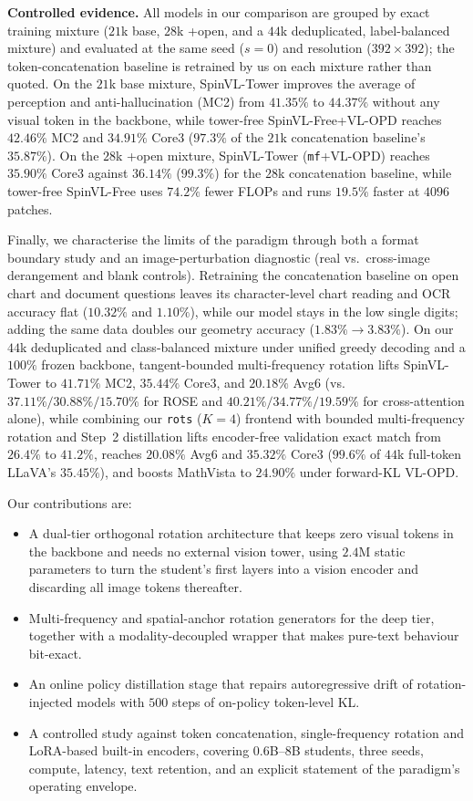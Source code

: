 \documentclass[10pt,twocolumn,letterpaper]{article}
\newcommand{\modelname}{SpinVL}
\begin{document}
\textbf{Controlled evidence.} All models in our comparison are grouped by exact
training mixture ($21$k base, $28$k +open, and a $44$k deduplicated,
label-balanced mixture) and evaluated at the same seed ($s{=}0$) and resolution
($392{\times}392$); the token-concatenation baseline is retrained by us on each
mixture rather than quoted. On the $21$k base mixture, \modelname-Tower{}
improves the average of perception and anti-hallucination (MC2) from $41.35\%$
to $44.37\%$ without any visual token in the backbone, while tower-free
\modelname-Free{}+VL-OPD reaches $42.46\%$ MC2 and $34.91\%$ Core3 ($97.3\%$ of
the $21$k concatenation baseline's $35.87\%$). On the $28$k +open mixture,
\modelname-Tower{} (\texttt{mf}+VL-OPD) reaches $35.90\%$ Core3 against $36.14\%$
($99.3\%$) for the $28$k concatenation baseline, while tower-free
\modelname-Free{} uses $74.2\%$ fewer FLOPs and runs $19.5\%$ faster at
$4096$ patches.

Finally, we characterise the limits of the paradigm through both a format
boundary study and an image-perturbation diagnostic (real vs.\ cross-image
derangement and blank controls). Retraining the concatenation baseline on open
chart and document questions leaves its character-level chart reading and OCR
accuracy flat ($10.32\%$ and $1.10\%$), while our model stays in the low single
digits; adding the same data doubles our geometry accuracy ($1.83\%\to3.83\%$).
On our $44$k deduplicated and class-balanced mixture under unified greedy
decoding and a $100\%$ frozen backbone, tangent-bounded multi-frequency
rotation lifts \modelname-Tower{} to $41.71\%$ MC2, $35.44\%$ Core3, and
$20.18\%$ Avg6 (vs.\ $37.11\%/30.88\%/15.70\%$ for ROSE and
$40.21\%/34.77\%/19.59\%$ for cross-attention alone), while combining our
\texttt{rots} ($K{=}4$) frontend with bounded multi-frequency rotation and
Step~2 distillation lifts encoder-free validation exact match from $26.4\%$ to
$41.2\%$, reaches $20.08\%$ Avg6 and $35.32\%$ Core3 ($99.6\%$ of $44$k
full-token LLaVA's $35.45\%$), and boosts MathVista to $24.90\%$ under
forward-KL VL-OPD.

Our contributions are:
\begin{itemize}
\item A dual-tier orthogonal rotation architecture that keeps zero visual
tokens in the backbone and needs no external vision tower, using $2.4$M
static parameters to turn the student's first layers into a vision encoder and
discarding all image tokens thereafter.
\item Multi-frequency and spatial-anchor rotation generators for the deep
tier, together with a modality-decoupled wrapper that makes pure-text
behaviour bit-exact.
\item An online policy distillation stage that repairs autoregressive drift of
rotation-injected models with $500$ steps of on-policy token-level KL.
\item A controlled study against token concatenation, single-frequency
rotation and LoRA-based built-in encoders, covering $0.6$B--$8$B students,
three seeds, compute, latency, text retention, and an explicit statement of
the paradigm's operating envelope.
\end{itemize}
\end{document}
